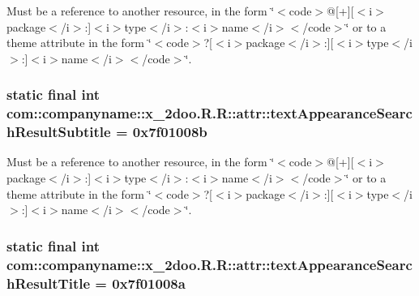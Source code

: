 Must be a reference to another resource, in the form \char`\"{}$<$code$>$@\mbox{[}+\mbox{]}\mbox{[}$<$i$>$package$<$/i$>$:\mbox{]}$<$i$>$type$<$/i$>$:$<$i$>$name$<$/i$>$$<$/code$>$\char`\"{} or to a theme attribute in the form \char`\"{}$<$code$>$?\mbox{[}$<$i$>$package$<$/i$>$:\mbox{]}\mbox{[}$<$i$>$type$<$/i$>$:\mbox{]}$<$i$>$name$<$/i$>$$<$/code$>$\char`\"{}. \hypertarget{classcom_1_1companyname_1_1x__2doo_1_1_r_1_1attr_e83b534544c711b33a468c31d932cbba}{
\subsubsection[{textAppearanceSearchResultSubtitle}]{\setlength{\rightskip}{0pt plus 5cm}static final int com::companyname::x\_\-2doo.R.R::attr::textAppearanceSearchResultSubtitle = 0x7f01008b}}
\label{classcom_1_1companyname_1_1x__2doo_1_1_r_1_1attr_e83b534544c711b33a468c31d932cbba}


Must be a reference to another resource, in the form \char`\"{}$<$code$>$@\mbox{[}+\mbox{]}\mbox{[}$<$i$>$package$<$/i$>$:\mbox{]}$<$i$>$type$<$/i$>$:$<$i$>$name$<$/i$>$$<$/code$>$\char`\"{} or to a theme attribute in the form \char`\"{}$<$code$>$?\mbox{[}$<$i$>$package$<$/i$>$:\mbox{]}\mbox{[}$<$i$>$type$<$/i$>$:\mbox{]}$<$i$>$name$<$/i$>$$<$/code$>$\char`\"{}. \hypertarget{classcom_1_1companyname_1_1x__2doo_1_1_r_1_1attr_653ca15316f25ee3eb81ee1122542ba0}{
\subsubsection[{textAppearanceSearchResultTitle}]{\setlength{\rightskip}{0pt plus 5cm}static final int com::companyname::x\_\-2doo.R.R::attr::textAppearanceSearchResultTitle = 0x7f01008a}}
\label{classcom_1_1companyname_1_1x__2doo_1_1_r_1_1attr_653ca15316f25ee3eb81ee1122542ba0}


